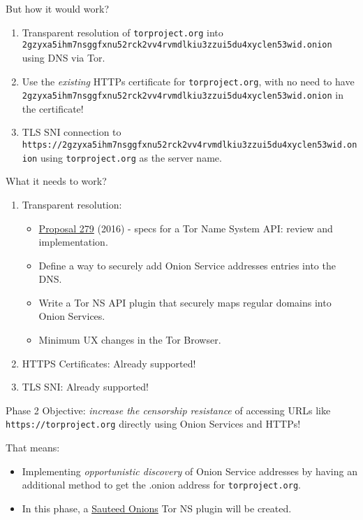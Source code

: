\documentclass[
  ignorenonframetext,
]{beamer}
\providecommand{\tightlist}{%
  \setlength{\itemsep}{0pt}\setlength{\parskip}{0pt}}
\begin{document}
\begin{frame}[fragile]{But how it would work?}
\protect\hypertarget{but-how-it-would-work}{}
\begin{enumerate}
\item
  Transparent resolution of \texttt{torproject.org} into
  \texttt{2gzyxa5ihm7nsggfxnu52rck2vv4rvmdlkiu3zzui5du4xyclen53wid.onion}
  using DNS via Tor.
\item
  Use the \emph{existing} HTTPs certificate for \texttt{torproject.org},
  with no need to have
  \texttt{2gzyxa5ihm7nsggfxnu52rck2vv4rvmdlkiu3zzui5du4xyclen53wid.onion}
  in the certificate!
\item
  TLS SNI connection to
  \texttt{https://2gzyxa5ihm7nsggfxnu52rck2vv4rvmdlkiu3zzui5du4xyclen53wid.onion}
  using \texttt{torproject.org} as the server name.
\end{enumerate}
\end{frame}

\begin{frame}{What it needs to work?}
\protect\hypertarget{what-it-needs-to-work}{}
\begin{enumerate}
\item
  Transparent resolution:

  \begin{itemize}
  \tightlist
  \item
    \href{https://gitlab.torproject.org/tpo/core/torspec/-/blob/main/proposals/279-naming-layer-api.txt}{Proposal
    279} (2016) - specs for a Tor Name System API: review and
    implementation.
  \item
    Define a way to securely add Onion Service addresses entries into
    the DNS.
  \item
    Write a Tor NS API plugin that securely maps regular domains into
    Onion Services.
  \item
    Minimum UX changes in the Tor Browser.
  \end{itemize}
\item
  HTTPS Certificates: Already supported!
\item
  TLS SNI: Already supported!
\end{enumerate}
\end{frame}

\begin{frame}[fragile]{Phase 2}
\protect\hypertarget{phase-2}{}
Objective: \emph{increase the censorship resistance} of accessing URLs
like \texttt{https://torproject.org} directly using Onion Services and
HTTPs!

That means:

\begin{itemize}
\item
  Implementing \emph{opportunistic discovery} of Onion Service addresses
  by having an additional method to get the .onion address for
  \texttt{torproject.org}.
\item
  In this phase, a \href{https://www.sauteed-onions.org}{Sauteed Onions}
  Tor NS plugin will be created.
\end{itemize}
\end{frame}
\end{document}
